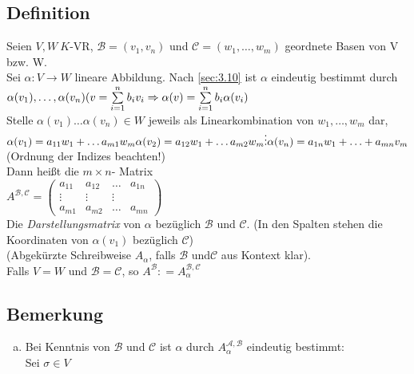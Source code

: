 \subsection{Definition}\label{sec:\thesubsection}
Seien $V,W\ K$-VR, $\mathcal{B} = (v_1,v_n)$ und $\mathcal{C} = (w_1,\ldots,w_m)$ geordnete Basen von V bzw. W.\\
Sei $\alpha: V \to W$ lineare Abbildung. Nach \ref{sec:3.10} ist $\alpha$ eindeutig bestimmt durch $\alpha(v_1),\ldots,\alpha(v_n)\\
(v = \sum\limits_{i=1}^{n} b_iv_i \Rightarrow \alpha(v) = \sum\limits_{i=1}^{n}b_i \alpha(v_i)$\\
Stelle $\alpha(v_1)\ldots\alpha(v_n) \in W$ jeweils als Linearkombination von $w_1,\ldots,w_m$ dar,\\
$\alpha(v_1) = a_{11}w_1 + \ldots a_{m1}w_m\\
\alpha(v_2) = a_{12}w_1 + \ldots a_{m2}w_m\\
\hfil\vdots\\
\alpha(v_n) = a_{1n} w_1 + \ldots + a_{mn}v_m$\\
(Ordnung der Indizes beachten!)\\
Dann hei\ss t die $m \times n$- Matrix\\
$A^{\mathcal{B,C}} = \begin{pmatrix}
a_{11}&a_{12}&\ldots&a_{1n}\\
\vdots&\vdots&\vdots\\
a_{m1}&a_{m2}&\ldots&a_{mn}
\end{pmatrix}$\\
Die \emph{Darstellungsmatrix} von $\alpha$ bezüglich $\mathcal{B}$ und $\mathcal{C}$. (In den Spalten stehen die Koordinaten von $\alpha(v_1)$ bezüglich $\mathcal{C}$)\\
(Abgekürzte Schreibweise $A_\alpha$, falls $\mathcal{B}$ und$ \mathcal{C}$ aus Kontext klar).\\
Falls $V = W$ und $\mathcal{B} = \mathcal{C}$, so $A^{\mathcal{B}} \colon= A^{\mathcal{B,C}}_\alpha$
\subsection{Bemerkung}\label{sec:\thesubsection}
\begin{enumerate}[a)]
\item Bei Kenntnis von $\mathcal{B}$ und $\mathcal{C}$ ist $\alpha$ durch $A^{\mathcal{A,B}}_\alpha$ eindeutig bestimmt:\\
Sei $\sigma \in V$
\end{enumerate}
